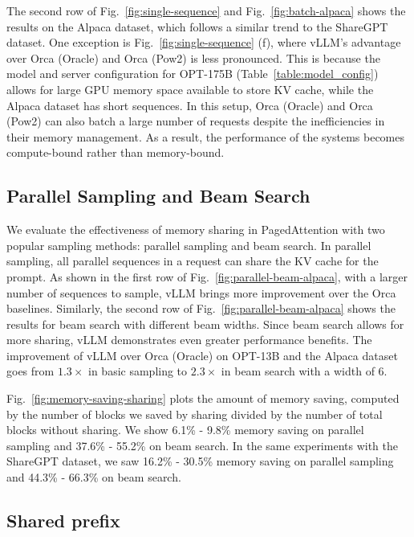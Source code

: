 The second row of Fig.~\ref{fig:single-sequence} and Fig.~\ref{fig:batch-alpaca} shows the results on the Alpaca dataset, which follows a similar trend to the ShareGPT dataset. One exception is Fig.~\ref{fig:single-sequence} (f), where vLLM's advantage over Orca (Oracle) and Orca (Pow2) is less pronounced. This is because the model and server configuration for OPT-175B (Table~\ref{table:model_config}) allows for large GPU memory space available to store KV cache, while the Alpaca dataset has short sequences. In this setup, Orca (Oracle) and Orca (Pow2) can also batch a large number of requests despite the inefficiencies in their memory management. As a result, the performance of the systems becomes compute-bound rather than memory-bound.

\subsection{Parallel Sampling and Beam Search}
\label{sec:eval:beamsearch}

We evaluate the effectiveness of memory sharing in PagedAttention with two popular sampling methods: parallel sampling and beam search. In parallel sampling, all parallel sequences in a request can share the KV cache for the prompt. As shown in the first row of Fig.~\ref{fig:parallel-beam-alpaca}, with a larger number of sequences to sample, vLLM brings more improvement over the Orca baselines. Similarly, the second row of Fig.~\ref{fig:parallel-beam-alpaca} shows the results for beam search with different beam widths. Since beam search allows for more sharing, vLLM demonstrates even greater performance benefits. The improvement of vLLM over Orca (Oracle) on OPT-13B and the Alpaca dataset goes from $1.3 \times$ in basic sampling to $2.3 \times$ in beam search with a width of 6.

Fig.~\ref{fig:memory-saving-sharing} plots the amount of memory saving, computed by the number of blocks we saved by sharing divided by the number of total blocks without sharing. We show 6.1\% - 9.8\% memory saving on parallel sampling and 37.6\% - 55.2\% on beam search. In the same experiments with the ShareGPT dataset, we saw 16.2\% - 30.5\% memory saving on parallel sampling and 44.3\% - 66.3\% on beam search.

\subsection{Shared prefix}

